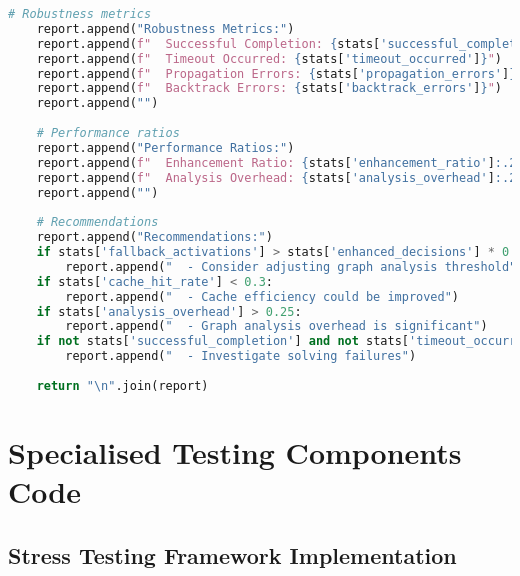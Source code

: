 \begin{lstlisting}[language=Python, caption=Integration Challenge Resolution Implementation]
    # Robustness metrics
    report.append("Robustness Metrics:")
    report.append(f"  Successful Completion: {stats['successful_completion']}")
    report.append(f"  Timeout Occurred: {stats['timeout_occurred']}")
    report.append(f"  Propagation Errors: {stats['propagation_errors']}")
    report.append(f"  Backtrack Errors: {stats['backtrack_errors']}")
    report.append("")
    
    # Performance ratios
    report.append("Performance Ratios:")
    report.append(f"  Enhancement Ratio: {stats['enhancement_ratio']:.2%}")
    report.append(f"  Analysis Overhead: {stats['analysis_overhead']:.2%}")
    report.append("")
    
    # Recommendations
    report.append("Recommendations:")
    if stats['fallback_activations'] > stats['enhanced_decisions'] * 0.2:
        report.append("  - Consider adjusting graph analysis threshold")
    if stats['cache_hit_rate'] < 0.3:
        report.append("  - Cache efficiency could be improved")
    if stats['analysis_overhead'] > 0.25:
        report.append("  - Graph analysis overhead is significant")
    if not stats['successful_completion'] and not stats['timeout_occurred']:
        report.append("  - Investigate solving failures")
    
    return "\n".join(report)
\end{lstlisting}

\section{Specialised Testing Components Code}
\label{appendix:specialised-testing-components}

\subsection{Stress Testing Framework Implementation}
\label{appendix:stress-testing}

